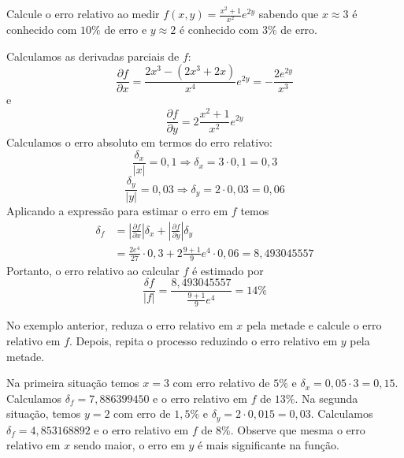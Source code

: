 \begin{ex} Calcule o erro relativo ao medir $f(x,y)=\frac{x^2+1}{x^2}e^{2y}$ sabendo que $x\approx 3$ é conhecido com $10\%$ de erro e $y\approx 2$ é conhecido com $3\%$ de erro.
\end{ex}
\begin{sol}
Calculamos as derivadas parciais de $f$:
\begin{equation}
\frac{\partial f}{\partial x}=\frac{2x^3-(2x^3+2x)}{x^4}e^{2y}=-\frac{2e^{2y}}{x^3}
\end{equation}
e
\begin{equation}
\frac{\partial f}{\partial y}=2\frac{x^2+1}{x^2}e^{2y}
\end{equation}
Calculamos o erro absoluto em termos do erro relativo:
\begin{equation}
\frac{\delta_x}{|x|}=0,1\Rightarrow \delta_x= 3\cdot 0,1=0,3
\end{equation}
\begin{equation}
\frac{\delta_y}{|y|}=0,03\Rightarrow \delta_y= 2\cdot 0,03=0,06
\end{equation}
Aplicando a expressão para estimar o erro em $f$ temos
\begin{eqnarray}
\delta_f &= \left|\frac{\partial f}{\partial x}\right|\delta_x+\left|\frac{\partial f}{\partial y}\right|\delta_y\\
&= \frac{2e^{4}}{27}\cdot 0,3+2\frac{9+1}{9}e^{4}\cdot 0,06=8,493045557
\end{eqnarray}
Portanto, o erro relativo ao calcular $f$ é estimado por
\begin{equation}
\frac{\delta f}{|f|}=\frac{8,493045557}{\frac{9+1}{9}e^{4}}=14\%
\end{equation}
\end{sol}

\begin{ex} No exemplo anterior, reduza o erro relativo em $x$ pela metade e calcule o erro relativo em $f$. Depois, repita o processo reduzindo o erro relativo em $y$ pela metade.
\end{ex}
\begin{sol}
Na primeira situação temos $x=3$ com erro relativo de $5\%$ e $\delta_x=0,05\cdot 3=0,15$. Calculamos $\delta_f=7,886399450$ e o erro relativo em $f$ de $13\%$. Na segunda situação, temos $y=2$ com erro de $1,5\%$ e $\delta_y=2\cdot 0,015=0,03$. Calculamos $\delta_f=4,853168892$ e o erro relativo em $f$ de $8\%$. Observe que mesma o erro relativo em $x$ sendo maior, o erro em $y$ é mais significante na função.
\end{sol}


